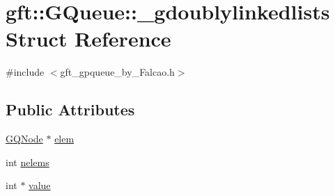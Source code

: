 \hypertarget{structgft_1_1GQueue_1_1__gdoublylinkedlists}{\section{gft\-:\-:G\-Queue\-:\-:\-\_\-gdoublylinkedlists Struct Reference}
\label{structgft_1_1GQueue_1_1__gdoublylinkedlists}
}


{\ttfamily \#include $<$gft\-\_\-gpqueue\-\_\-by\-\_\-\-Falcao.\-h$>$}

\subsection*{Public Attributes}
\begin{DoxyCompactItemize}
\item 
\hyperlink{namespacegft_1_1GQueue_ac7674cc67b8bc9f99e7be02c493f473e}{G\-Q\-Node} $\ast$ \hyperlink{structgft_1_1GQueue_1_1__gdoublylinkedlists_a381d0f6225cc5644302a285b7535e9d3}{elem}
\item 
int \hyperlink{structgft_1_1GQueue_1_1__gdoublylinkedlists_ab103b5cd4de4ad5b7053f05102c62595}{nelems}
\item 
int $\ast$ \hyperlink{structgft_1_1GQueue_1_1__gdoublylinkedlists_a0c1b6b1d931f88f969d1d6f1ee61828b}{value}
\end{DoxyCompactItemize}


